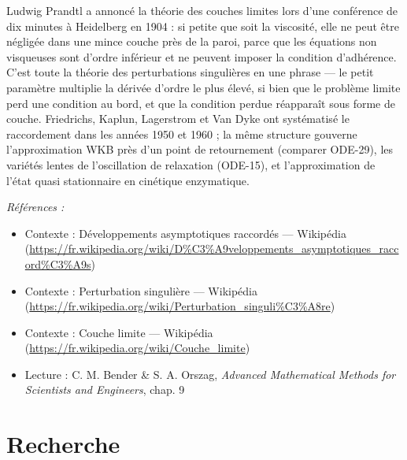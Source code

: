\documentclass[11pt]{article}
\newenvironment{refs}{\par\small\noindent\emph{Références :}\begin{itemize}\setlength\itemsep{0pt}}{\end{itemize}\normalsize}
\begin{document}
\noindent Ludwig Prandtl a annoncé la théorie des couches limites lors d'une conférence de
dix minutes à Heidelberg en 1904 : si petite que soit la viscosité, elle ne peut être négligée
dans une mince couche près de la paroi, parce que les équations non visqueuses sont d'ordre
inférieur et ne peuvent imposer la condition d'adhérence. C'est toute la théorie des perturbations
singulières en une phrase --- le petit paramètre multiplie la dérivée d'ordre le plus élevé, si bien
que le problème limite perd une condition au bord, et que la condition perdue réapparaît sous
forme de couche. Friedrichs, Kaplun, Lagerstrom et Van Dyke ont systématisé le raccordement dans
les années 1950 et 1960 ; la même structure gouverne l'approximation WKB près d'un point de
retournement (comparer ODE-29), les variétés lentes de l'oscillation de relaxation (ODE-15), et
l'approximation de l'état quasi stationnaire en cinétique enzymatique.

\begin{refs}
\item Contexte : Développements asymptotiques raccordés --- Wikipédia (\url{https://fr.wikipedia.org/wiki/D%C3%A9veloppements_asymptotiques_raccord%C3%A9s})
\item Contexte : Perturbation singulière --- Wikipédia (\url{https://fr.wikipedia.org/wiki/Perturbation_singuli%C3%A8re})
\item Contexte : Couche limite --- Wikipédia (\url{https://fr.wikipedia.org/wiki/Couche_limite})
\item Lecture : C. M. Bender \& S. A. Orszag, \textit{Advanced Mathematical Methods for Scientists and Engineers}, chap. 9
\end{refs}

\bigskip


\section*{Recherche}
\end{document}
